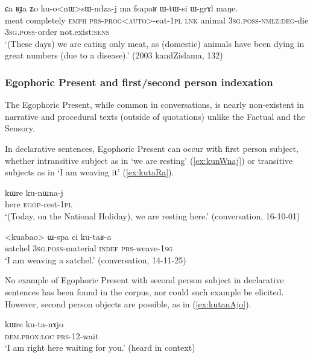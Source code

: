 \begin{exe}
\ex \label{ex:konWsWndzaj2}
\gll ɕa ʁɟa ʑo ku-o<nɯ>sɯ-ndza-j ma fsapaʁ ɯ-tɯ-si ɯ-grɤl maŋe. \\
meat completely \textsc{emph} \textsc{prs}-\textsc{prog}<\textsc{auto}>-eat-\textsc{1pl} \textsc{lnk} animal \textsc{3sg}.\textsc{poss}-\textsc{nmlz}:\textsc{deg}-die \textsc{3sg}.\textsc{poss}-order not.exist:\textsc{sens} \\
\glt `(These days) we are eating only meat, as (domestic) animals have been dying in great numbers (due to a disease).' (2003 kandZislama, 132)
\end{exe}

\subsubsection{Egophoric Present and first/second person indexation} \label{sec:egophoric.evd} \label{sec:egophoric.interrogative}
The Egophoric Present, while common in conversations, is nearly non-existent in narrative and procedural texts (outside of quotations) unlike the Factual and the Sensory. 

In declarative sentences, Egophoric Present can occur with first person subject, whether intransitive subject as in  `we are resting' (\ref{ex:kunWnaj}) or transitive subjects as in  `I am weaving it' (\ref{ex:kutaRa}).

\begin{exe}
	\ex \label{ex:kunWnaj}
	\gll kɯre ku-nɯna-j \\
	here \textsc{egop}-rest-\textsc{1pl} \\
	\glt `(Today, on the National Holiday), we are resting here.' (conversation, 16-10-01)
\end{exe}
	
\begin{exe}
\ex \label{ex:kutaRa}
\gll <kuabao> ɯ-spa ci ku-taʁ-a \\
satchel \textsc{3sg}.\textsc{poss}-material \textsc{indef} \textsc{prs}-weave-\textsc{1sg} \\
\glt `I am weaving a satchel.' (conversation, 14-11-25)
\end{exe}

No example of Egophoric Present with second person subject in declarative sentences has been found in the corpus, nor could such example be elicited. However, second person objects are possible, as in (\ref{ex:kutanAjo}).

\begin{exe}
	\ex \label{ex:kutanAjo}
	\gll kɯre ku-ta-nɤjo \\
	\textsc{dem}.\textsc{prox}:\textsc{loc} \textsc{prs}-1\fl{}2-wait \\
	\glt `I am right here waiting for you.' (heard in context)
\end{exe}


